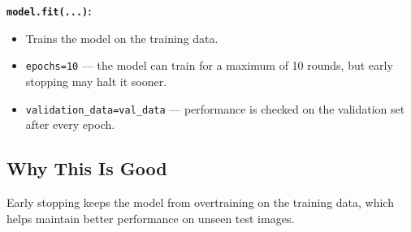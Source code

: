 \documentclass[12pt]{article}
\begin{document}
\textbf{\texttt{model.fit(...)}:}
\begin{itemize}
    \item Trains the model on the training data.
    \item \texttt{epochs=10} --- the model can train for a maximum of 10 rounds, but early stopping may halt it sooner.
    \item \texttt{validation\_data=val\_data} --- performance is checked on the validation set after every epoch.
\end{itemize}

\subsection*{Why This Is Good}

Early stopping keeps the model from overtraining on the training data, which helps maintain better performance on unseen test images.
\end{document}

